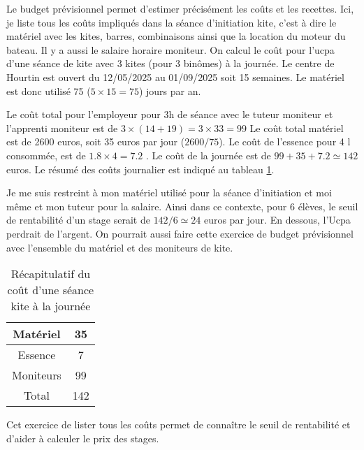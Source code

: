 \documentclass[11pt,a4paper]{report}
\begin{document}
Le budget prévisionnel permet d'estimer précisément les co\^uts et les recettes.
Ici, je liste tous les coûts impliqués dans la séance d’initiation kite, 
c'est  à dire le matériel avec les kites, barres, combinaisons ainsi que
la location du moteur du bateau. Il y a aussi le salaire horaire moniteur. 
On calcul le coût pour l'ucpa
d'une séance de kite avec 3 kites (pour 3 binômes) à la journée.
Le centre de Hourtin est ouvert du 12/05/2025 au 01/09/2025 soit 15 semaines.
Le matériel est donc utilisé 75 ($5\times15=75$) jours par an.

Le coût total pour l'employeur pour 3h de séance avec le tuteur moniteur
et l'apprenti moniteur est de $3\times(14+19) = 3\times33 = 99 $
Le coût total matériel est de 2600 euros, soit 35 euros par jour ($2600/75$).
Le coût de l'essence pour 4 l consommée, est de $1.8\times4 = 7.2$ .
Le coût de la journée est de $99 + 35 + 7.2 \simeq  142 $ euros.
Le résumé des coûts journalier est indiqué au tableau \ref{cout_journalier}.

Je me suis restreint à  mon matériel utilisé pour la séance d’initiation
et moi m\^eme et mon tuteur pour la salaire. Ainsi dans ce contexte, 
pour 6 élèves, le seuil de rentabilité d'un stage serait de $142/6 \simeq 24$ euros
par jour. En dessous, l'Ucpa perdrait de l'argent.
On pourrait aussi faire cette exercice de budget prévisionnel avec
l'ensemble du matériel et des moniteurs de kite.

\begin{table}
\begin{centering}
\begin{tabular}{|c|c|}
\hline
Matériel  & 35 \\
\hline
Essence   & 7   \\
\hline
Moniteurs  & 99 \\
\hline
Total     & 142 \\
\hline
\end{tabular}
\caption{Récapitulatif du co\^ut d'une séance kite à la journée\label{cout_journalier}}
\end{centering}
\end{table}

Cet exercice de lister tous les co\^uts permet de connaître le seuil 
de rentabilité et d'aider à calculer le prix des stages.

\end{document}
